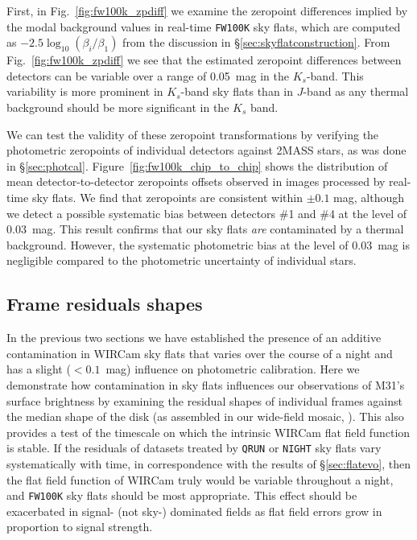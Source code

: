 \documentclass[iop]{emulateapj}
\newcommand{\Fig}[1]{Fig.~\ref{fig:#1}}  %
\newcommand{\Sec}[1]{\S\ref{sec:#1}}  %
\begin{document}
First, in \Fig{fw100k_zpdiff} we examine the zeropoint differences implied by the modal background values in real-time \texttt{FW100K} sky flats, which are computed as $-2.5 \log_{10}(\beta_i / \beta_1)$ from the discussion in \Sec{skyflatconstruction}.
From \Fig{fw100k_zpdiff} we see that the estimated zeropoint differences between detectors can be variable over a range of 0.05~mag in the $K_s$-band.
This variability is more prominent in $K_s$-band sky flats than in $J$-band as any thermal background should be more significant in the $K_s$ band.

We can test the validity of these zeropoint transformations by verifying the photometric zeropoints of individual detectors against 2MASS stars, as was done in \Sec{photcal}.
Figure~\ref{fig:fw100k_chip_to_chip} shows the distribution of mean detector-to-detector zeropoints offsets observed in images processed by real-time sky flats.
We find that zeropoints are consistent within $\pm 0.1$ mag, although we detect a possible systematic bias between detectors \#1 and \#4 at the level of $0.03$~mag.
This result confirms that our sky flats \emph{are} contaminated by a thermal background.
However, the systematic photometric bias at the level of $0.03$~mag is negligible compared to the photometric uncertainty of individual stars.

\subsection{Frame residuals shapes}
\label{sec:frameblockresiduals}

In the previous two sections we have established the presence of an additive contamination in WIRCam sky flats that varies over the course of a night and has a slight ($<0.1$~mag) influence on photometric calibration.
Here we demonstrate how contamination in sky flats influences our observations of M31's surface brightness by examining the residual shapes of individual frames against the median shape of the disk (as assembled in our wide-field mosaic, ).
This also provides a test of the timescale on which the intrinsic WIRCam flat field function is stable.
If the residuals of datasets treated by \texttt{QRUN} or \texttt{NIGHT} sky flats vary systematically with time, in correspondence with the results of \Sec{flatevo}, then the flat field function of WIRCam truly would be variable throughout a night, and \texttt{FW100K} sky flats should be most appropriate.
This effect should be exacerbated in signal- (not sky-) dominated fields as flat field errors grow in proportion to signal strength.
\end{document}
